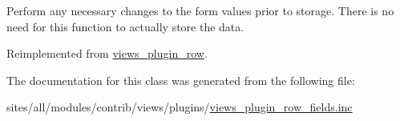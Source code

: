 Perform any necessary changes to the form values prior to storage. There is no need for this function to actually store the data. 

Reimplemented from \hyperlink{classviews__plugin__row_083534753b8e7e30d6d5b14d93f10bf4}{views\_\-plugin\_\-row}.

The documentation for this class was generated from the following file:\begin{CompactItemize}
\item 
sites/all/modules/contrib/views/plugins/\hyperlink{views__plugin__row__fields_8inc}{views\_\-plugin\_\-row\_\-fields.inc}\end{CompactItemize}
